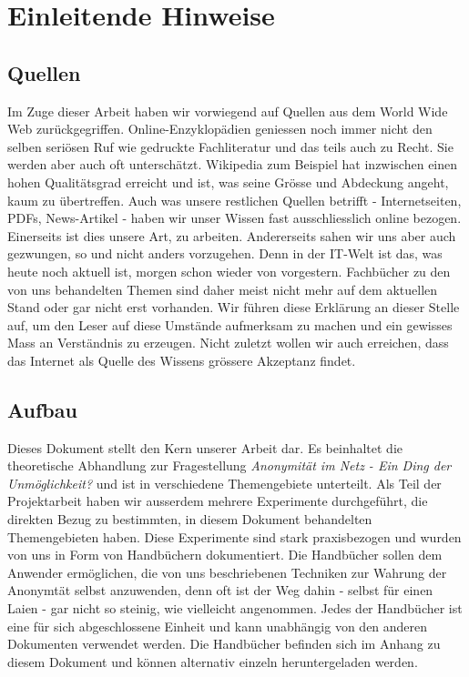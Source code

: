 \section{Einleitende Hinweise}

\subsection{Quellen}
Im Zuge dieser Arbeit haben wir vorwiegend auf Quellen aus dem World Wide Web zurückgegriffen. Online-Enzyklopädien geniessen noch immer nicht den selben seriösen Ruf wie gedruckte Fachliteratur und das teils auch zu Recht. Sie werden aber auch oft unterschätzt. Wikipedia zum Beispiel hat inzwischen einen hohen Qualitätsgrad erreicht und ist, was seine Grösse und Abdeckung angeht, kaum zu übertreffen. Auch was unsere restlichen Quellen betrifft - Internetseiten, PDFs, News-Artikel - haben wir unser Wissen fast ausschliesslich online bezogen. Einerseits ist dies unsere Art, zu arbeiten. Andererseits sahen wir uns aber auch gezwungen, so und nicht anders vorzugehen. Denn in der IT-Welt ist das, was heute noch aktuell ist, morgen schon wieder von vorgestern. Fachbücher zu den von uns behandelten Themen sind daher meist nicht mehr auf dem aktuellen Stand oder gar nicht erst vorhanden. Wir führen diese Erklärung an dieser Stelle auf, um den Leser auf diese Umstände aufmerksam zu machen und ein gewisses Mass an Verständnis zu erzeugen. Nicht zuletzt wollen wir auch erreichen, dass das Internet als Quelle des Wissens grössere Akzeptanz findet.

\subsection{Aufbau}
Dieses Dokument stellt den Kern unserer Arbeit dar. Es beinhaltet die theoretische Abhandlung zur Fragestellung \textit{Anonymität im Netz - Ein Ding der Unmöglichkeit?} und ist in verschiedene Themengebiete unterteilt. Als Teil der Projektarbeit haben wir ausserdem mehrere Experimente durchgeführt, die direkten Bezug zu bestimmten, in diesem Dokument behandelten Themengebieten haben. Diese Experimente sind stark praxisbezogen und  wurden von uns in Form von Handbüchern dokumentiert. Die Handbücher sollen dem Anwender ermöglichen, die von uns beschriebenen Techniken zur Wahrung der Anonymtät selbst anzuwenden, denn oft ist der Weg dahin - selbst für einen Laien - gar nicht so steinig, wie vielleicht angenommen. Jedes der Handbücher ist eine für sich abgeschlossene Einheit und kann unabhängig von den anderen Dokumenten verwendet werden. Die Handbücher befinden sich im Anhang zu diesem Dokument und können alternativ einzeln heruntergeladen werden.

